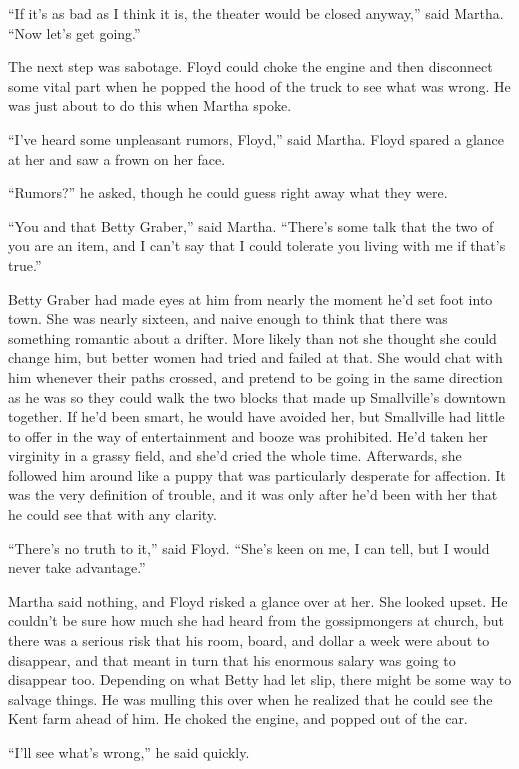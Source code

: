 ``If it's as bad as I think it is, the theater would be closed anyway,''
said Martha. ``Now let's get going.''

The next step was sabotage. Floyd could choke the engine and then
disconnect some vital part when he popped the hood of the truck to see
what was wrong. He was just about to do this when Martha spoke.

``I've heard some unpleasant rumors, Floyd,'' said Martha. Floyd spared
a glance at her and saw a frown on her face.

``Rumors?'' he asked, though he could guess right away what they were.

``You and that Betty Graber,'' said Martha. ``There's some talk that the
two of you are an item, and I can't say that I could tolerate you living
with me if that's true.''

Betty Graber had made eyes at him from nearly the moment he'd set foot
into town. She was nearly sixteen, and naive enough to think that there
was something romantic about a drifter. More likely than not she thought
she could change him, but better women had tried and failed at that. She
would chat with him whenever their paths crossed, and pretend to be
going in the same direction as he was so they could walk the two blocks
that made up Smallville's downtown together. If he'd been smart, he
would have avoided her, but Smallville had little to offer in the way of
entertainment and booze was prohibited. He'd taken her virginity in a
grassy field, and she'd cried the whole time. Afterwards, she followed
him around like a puppy that was particularly desperate for affection.
It was the very definition of trouble, and it was only after he'd been
with her that he could see that with any clarity.

``There's no truth to it,'' said Floyd. ``She's keen on me, I can tell,
but I would never take advantage.''

Martha said nothing, and Floyd risked a glance over at her. She looked
upset. He couldn't be sure how much she had heard from the gossipmongers
at church, but there was a serious risk that his room, board, and dollar
a week were about to disappear, and that meant in turn that his enormous
salary was going to disappear too. Depending on what Betty had let slip,
there might be some way to salvage things. He was mulling this over when
he realized that he could see the Kent farm ahead of him. He choked the
engine, and popped out of the car.

``I'll see what's wrong,'' he said quickly.

